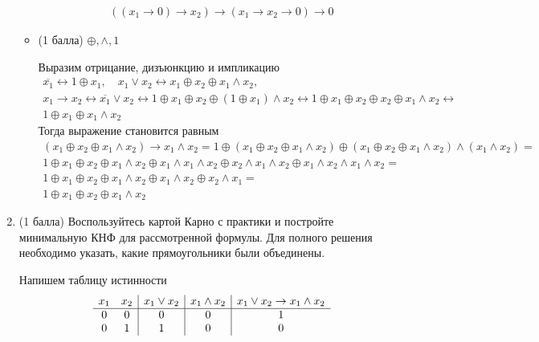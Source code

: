 \begin{enumerate}
\begin{itemize}
\begin{solution}
\begin{eqnarray}
        ((x_1 \rightarrow 0) \rightarrow x_2) \rightarrow (x_1 \rightarrow x_2 \rightarrow 0) \rightarrow 0
      \end{eqnarray}
    \end{solution}
    \item (1 балла) $\oplus, \land, 1$
    \begin{solution}
      Выразим отрицание, дизъюнкцию и импликацию
      \begin{eqnarray}
        \overline{x_1} \leftrightarrow 1 \oplus x_1, \quad x_1 \lor x_2 \leftrightarrow x_1 \oplus x_2 \oplus x_1 \land x_2, \\
        x_1 \rightarrow x_2 \leftrightarrow \overline{x_1} \lor x_2 \leftrightarrow 1 \oplus x_1 \oplus x_2 \oplus (1 \oplus x_1) \land x_2 \leftrightarrow 1 \oplus x_1 \oplus x_2 \oplus x_2 \oplus x_1 \land x_2 \leftrightarrow \\
        1 \oplus x_1 \oplus x_1 \land x_2
      \end{eqnarray}
      Тогда выражение становится равным
      \begin{eqnarray}
        (x_1 \oplus x_2 \oplus x_1 \land x_2) \rightarrow x_1 \land x_2 = 1 \oplus (x_1 \oplus x_2 \oplus x_1 \land x_2) \oplus (x_1 \oplus x_2 \oplus x_1 \land x_2) \land (x_1 \land x_2) = \\
        1 \oplus x_1 \oplus x_2 \oplus x_1 \land x_2 \oplus x_1 \land x_1 \land x_2 \oplus x_2 \land x_1 \land x_2 \oplus x_1 \land x_2 \land x_1 \land x_2 = \\
        1 \oplus x_1 \oplus x_2 \oplus x_1 \land x_2 \oplus x_1 \land x_2 \oplus x_2 \land x_1 = \\
        1 \oplus x_1 \oplus x_2 \oplus x_1 \land x_2
      \end{eqnarray}
    \end{solution}
  \end{itemize}
  \item (1 балла) Воспользуйтесь картой Карно с практики и постройте минимальную КНФ для рассмотренной формулы. Для полного решения необходимо указать, какие прямоугольники были объединены.
  \begin{solution}
    Напишем таблицу истинности
    \begin{displaymath}
      \begin{array}{c c|c|c|c}
        x_1 & x_2 & x_1 \lor x_2 & x_1 \land x_2 & x_1 \lor x_2 \rightarrow x_1 \land x_2\\
        \hline
        0 & 0 & 0 & 0 & 1\\
        0 & 1 & 1 & 0 & 0\\

\end{array}
\end{displaymath}
\end{solution}
\end{enumerate}
